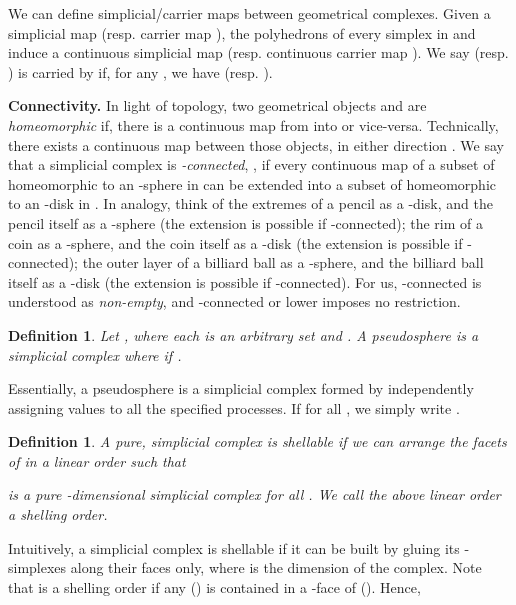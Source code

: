 \documentclass[11pt]{article}
\newtheorem{definition}[theorem]{Definition}
\begin{document}
We can define simplicial/carrier maps between geometrical complexes.
Given a simplicial map  (resp. carrier map ),
the polyhedrons of every simplex in  and 
induce a continuous simplicial map  (resp. continuous carrier map ).
We say  (resp. ) is carried by 
if, for any ,
we have  (resp. ).



\textbf{Connectivity.} 
In light of topology,
two geometrical objects  and  are \emph{homeomorphic} if,
there is a continuous map from  into  or vice-versa.
Technically,
there exists a continuous map between those objects, in either direction \cite{Munkres00,Munkres84}.
We say that a simplicial complex 
is \emph{-connected}, ,
if every continuous map
of a subset of  homeomorphic to an -sphere in 
can be extended into
a subset of  homeomorphic to an -disk in .
In analogy,
think of the extremes of a pencil as a -disk,
and the pencil itself as a -sphere (the extension is possible if -connected);
the rim of a coin as a -sphere,
and the coin itself as a -disk (the extension is possible if -connected);
the outer layer of a billiard ball as a -sphere,
and the billiard ball itself as a -disk (the extension is possible if -connected).
For us,
-connected is understood as \emph{non-empty},
and -connected or lower imposes no restriction.



\begin{definition}
\label{definition-pseudosphere}
Let ,
where each  is an arbitrary set and .
A \emph{pseudosphere}  is a simplicial complex where
 if
.
\end{definition}

Essentially,
a pseudosphere
is a simplicial complex formed by independently assigning values to all the specified processes.
If  for all ,
we simply write .



\begin{definition}
\label{definition-shellable}
A pure, simplicial complex  is \emph{shellable} if we can arrange the facets of 
in a linear order  such that

is a pure -dimensional simplicial complex for all .
We call the above linear order  a \emph{shelling order}.
\end{definition}

Intuitively,
a simplicial complex is shellable
if it can be built by gluing its -simplexes along their  faces only,
where  is the dimension of the complex.
Note that  is a shelling order
if any  ()
is contained in a -face of  ().
Hence,
\end{document}
